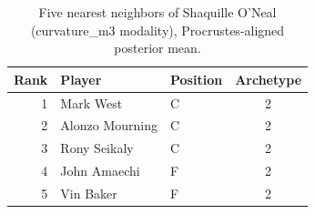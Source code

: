 \begin{table}[htbp]
  \centering\small
  \begin{tabular}{rllc}
    \toprule
    Rank & Player & Position & Archetype \\
    \midrule
    1 & Mark West & C & 2 \\
    2 & Alonzo Mourning & C & 2 \\
    3 & Rony Seikaly & C & 2 \\
    4 & John Amaechi & F & 2 \\
    5 & Vin Baker & F & 2 \\
    \bottomrule
  \end{tabular}
  \caption{Five nearest neighbors of Shaquille O'Neal (curvature_m3 modality), Procrustes-aligned posterior mean.}
  \label{tab:Shaquille_O_Neal_neighbors_curvature_m3}
\end{table}

